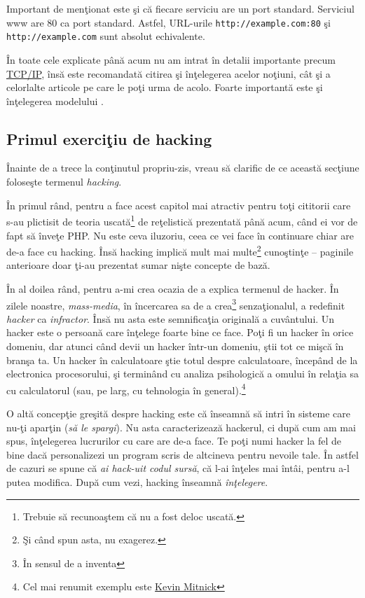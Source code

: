 Important de menţionat este şi că fiecare serviciu are un port standard. Serviciul www
are 80 ca port standard. Astfel, URL-urile \texttt{http://example.com:80} şi
\texttt{http://example.com} sunt absolut echivalente.

În toate cele explicate până acum nu am intrat în detalii importante precum
\href{http://en.wikipedia.org/wiki/Internet_Protocol_Suite}{TCP/IP}, însă este recomandată citirea şi
înţelegerea acelor noţiuni, cât şi a celorlalte articole pe care le poţi urma de acolo.
Foarte importantă este şi înţelegerea modelului
.

\subsection{Primul exerciţiu de hacking}

Înainte de a trece la conţinutul propriu-zis, vreau să clarific de ce această secţiune
foloseşte termenul \textsl{hacking}.

În primul rând, pentru a face acest capitol mai
atractiv pentru toţi cititorii care s-au plictisit de teoria uscată\footnote{Trebuie să
recunoaştem că nu a fost deloc uscată.} de reţelistică
prezentată până acum,
când ei vor de fapt să înveţe PHP. Nu este ceva iluzoriu, ceea ce vei face în continuare
chiar are de-a face cu hacking. Însă hacking implică mult mai multe\footnote{Şi când
spun asta, nu exagerez.}
 cunoştinţe -- paginile
anterioare doar ţi-au prezentat sumar nişte concepte de bază.

În al doilea rând, pentru a-mi crea ocazia de a explica termenul de hacker.
În zilele noastre, \textsl{mass-media}, în încercarea sa de a crea\footnote{În
sensul de {\glqq}a inventa{\grqq}} senzaţionalul,
a redefinit \textsl{hacker} ca \textit{infractor}. Însă nu asta este semnificaţia
originală a cuvântului. Un hacker este o persoană care înţelege foarte bine ce
face. Poţi fi un hacker în orice domeniu, dar atunci când devii un hacker într-un domeniu,
ştii tot ce mişcă în branşa ta. Un hacker în calculatoare ştie totul despre calculatoare,
începând de la electronica procesorului, şi terminând cu analiza psihologică a
omului în relaţia sa cu
calculatorul (sau, pe larg, cu tehnologia în general).\footnote{Cel mai renumit exemplu este
\href{http://en.wikipedia.org/wiki/Kevin_Mitnick}{Kevin Mitnick}}

O altă concepţie greşită despre hacking este că înseamnă să intri în sisteme care nu-ţi
aparţin (\textit{să le spargi}). Nu asta caracterizează hackerul, ci după cum am mai spus,
înţelegerea lucrurilor cu care are de-a face. Te poţi numi hacker la fel de bine
dacă personalizezi un program scris de altcineva pentru nevoile tale. În astfel
de cazuri se spune că \textsl{ai hack-uit codul sursă}, că l-ai înţeles mai întâi, pentru
a-l putea modifica. După cum vezi, hacking înseamnă \textit{înţelegere}.


